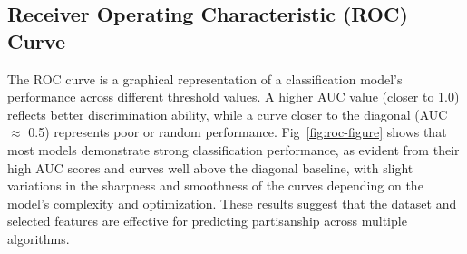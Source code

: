\documentclass[pt]{article}  %
\begin{document}
\subsection{Receiver Operating Characteristic (ROC) Curve}

The ROC curve is a graphical representation of a classification model's performance across different threshold values. A higher AUC value (closer to 1.0) reflects better discrimination ability, while a curve closer to the diagonal (AUC $\approx$ 0.5) represents poor or random performance\cite{ref12}. Fig~\ref{fig:roc-figure} shows that most models demonstrate strong classification performance, as evident from their high AUC scores and curves well above the diagonal baseline, with slight variations in the sharpness and smoothness of the curves depending on the model's complexity and optimization. These results suggest that the dataset and selected features are effective for predicting partisanship across multiple algorithms.
\end{document}
